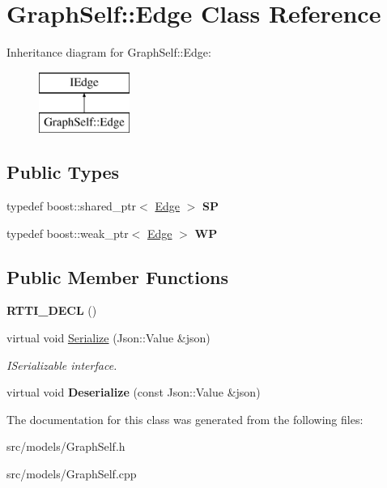 \hypertarget{class_graph_self_1_1_edge}{}\section{Graph\+Self\+:\+:Edge Class Reference}
\label{class_graph_self_1_1_edge}
Inheritance diagram for Graph\+Self\+:\+:Edge\+:\begin{figure}[H]
\begin{center}
\leavevmode
\includegraphics[height=2.000000cm]{class_graph_self_1_1_edge}
\end{center}
\end{figure}
\subsection*{Public Types}
\begin{DoxyCompactItemize}
\item 
\mbox{\label{class_graph_self_1_1_edge_a3d61c5aa0974830bf1ad49d7a6ca8066}} 
typedef boost\+::shared\+\_\+ptr$<$ \hyperlink{class_graph_self_1_1_edge}{Edge} $>$ {\bfseries SP}
\item 
\mbox{\label{class_graph_self_1_1_edge_a82161fe91f11aa2780e54fd3807d1dd8}} 
typedef boost\+::weak\+\_\+ptr$<$ \hyperlink{class_graph_self_1_1_edge}{Edge} $>$ {\bfseries WP}
\end{DoxyCompactItemize}
\subsection*{Public Member Functions}
\begin{DoxyCompactItemize}
\item 
\mbox{\label{class_graph_self_1_1_edge_a83a6b6b4edcc15b745424b4170f68a3b}} 
{\bfseries R\+T\+T\+I\+\_\+\+D\+E\+CL} ()
\item 
\mbox{\label{class_graph_self_1_1_edge_a21c5a0150dd98700610df657b94bf763}} 
virtual void \hyperlink{class_graph_self_1_1_edge_a21c5a0150dd98700610df657b94bf763}{Serialize} (Json\+::\+Value \&json)
\begin{DoxyCompactList}\small\item\em I\+Serializable interface. \end{DoxyCompactList}\item 
\mbox{\label{class_graph_self_1_1_edge_a33c36713307d7e2419e163b43039e531}} 
virtual void {\bfseries Deserialize} (const Json\+::\+Value \&json)
\end{DoxyCompactItemize}


The documentation for this class was generated from the following files\+:\begin{DoxyCompactItemize}
\item 
src/models/Graph\+Self.\+h\item 
src/models/Graph\+Self.\+cpp\end{DoxyCompactItemize}
